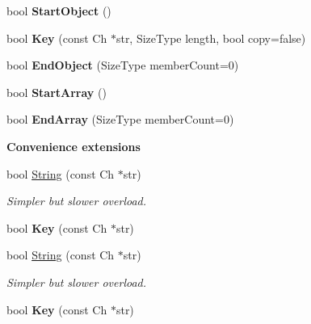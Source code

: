 \begin{Indent}
\begin{DoxyCompactItemize}
\item 
\mbox{\label{classPrettyWriter_a445e063722149f86bf1a0cd7b8892f07}} 
bool {\bfseries Start\+Object} ()
\item 
\mbox{\label{classPrettyWriter_a26932858cdca972598f7caa6f415f310}} 
bool {\bfseries Key} (const Ch $\ast$str, Size\+Type length, bool copy=false)
\item 
\mbox{\label{classPrettyWriter_a5837a63cac4735eaeedbaff287e1ab9e}} 
bool {\bfseries End\+Object} (Size\+Type member\+Count=0)
\item 
\mbox{\label{classPrettyWriter_a12dd02678ab52b9061bb6ac01cca2601}} 
bool {\bfseries Start\+Array} ()
\item 
\mbox{\label{classPrettyWriter_a5196275e826a37a163d178da612f58f9}} 
bool {\bfseries End\+Array} (Size\+Type member\+Count=0)
\end{DoxyCompactItemize}
\end{Indent}
\begin{Indent}\textbf{ Convenience extensions}\par
\begin{DoxyCompactItemize}
\item 
\mbox{\label{classPrettyWriter_ac6ef0185174838b7034b4183013ee073}} 
bool \hyperlink{classPrettyWriter_ac6ef0185174838b7034b4183013ee073}{String} (const Ch $\ast$str)
\begin{DoxyCompactList}\small\item\em Simpler but slower overload. \end{DoxyCompactList}\item 
\mbox{\label{classPrettyWriter_a0a4859ad940668cf33d18b144e5e1cdd}} 
bool {\bfseries Key} (const Ch $\ast$str)
\item 
\mbox{\label{classPrettyWriter_ac6ef0185174838b7034b4183013ee073}} 
bool \hyperlink{classPrettyWriter_ac6ef0185174838b7034b4183013ee073}{String} (const Ch $\ast$str)
\begin{DoxyCompactList}\small\item\em Simpler but slower overload. \end{DoxyCompactList}\item 
\mbox{\label{classPrettyWriter_a0a4859ad940668cf33d18b144e5e1cdd}} 
bool {\bfseries Key} (const Ch $\ast$str)
\end{DoxyCompactItemize}
\end{Indent}
